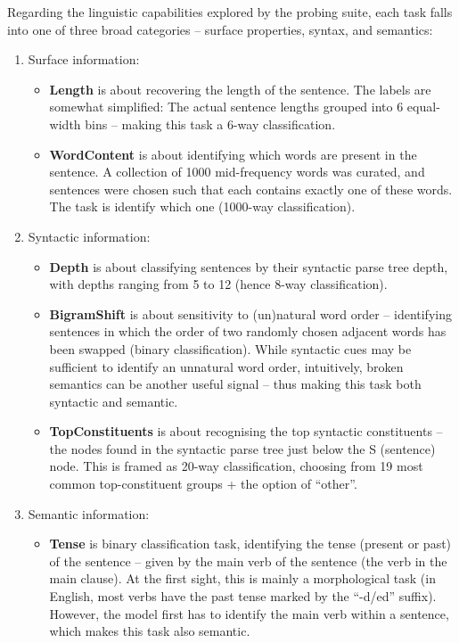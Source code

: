 \documentclass[bsc,frontabs,singlespacing,parskip,deptreport]{infthesis}
\begin{document}
{{    Regarding the linguistic capabilities explored by the probing suite, each task falls into one of three broad categories -- surface properties, syntax, and semantics:
    \begin{enumerate}
      \item {Surface information:
        \begin{itemize}
          \item \textbf{Length} is about recovering the length of the sentence. The labels are somewhat simplified: The actual sentence lengths grouped into 6 equal-width bins -- making this task a 6-way classification.
          \item \textbf{WordContent} is about identifying which words are present in the sentence. A collection of 1000 mid-frequency words was curated, and sentences were chosen such that each contains exactly one of these words. The task is identify which one (1000-way classification).
        \end{itemize}
      }
      \item{Syntactic information:
        \begin{itemize}
          \item \textbf{Depth} is about classifying sentences by their syntactic parse tree depth, with depths ranging from 5 to 12 (hence 8-way classification).
          \item \textbf{BigramShift} is about sensitivity to (un)natural word order -- identifying sentences in which the order of two randomly chosen adjacent words has been swapped (binary classification). While syntactic cues may be sufficient to identify an unnatural word order, intuitively, broken semantics can be another useful signal -- thus making this task both syntactic and semantic.
          \item \textbf{TopConstituents} is about recognising the top syntactic constituents -- the nodes found in the syntactic parse tree just below the S (sentence) node. This is framed as 20-way classification, choosing from 19 most common top-constituent groups + the option of ``other''.
        \end{itemize}
      }
      \item{Semantic information:
        \begin{itemize}
          \item \textbf{Tense} is binary classification task, identifying the tense (present or past) of the sentence -- given by the main verb of the sentence (the verb in the main clause). At the first sight, this is mainly a morphological task (in English, most verbs have the past tense marked by the ``-d/ed'' suffix). However, the model first has to identify the main verb within a sentence, which makes this task also semantic.

\end{itemize}}
\end{enumerate}}}
\end{document}
